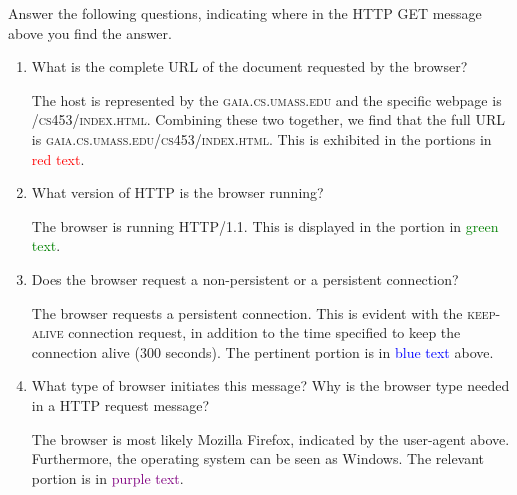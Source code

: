\begin{enumerate}
    Answer the following questions, indicating where in the HTTP GET message above you find the answer.

    \begin{enumerate}

      \item What is the complete URL of the document requested by the browser?

        The host is represented by the \textsc{gaia.cs.umass.edu} and the specific webpage is \textsc{/cs453/index.html}. Combining these two together, we find that the full URL is \textsc{gaia.cs.umass.edu/cs453/index.html}. This is exhibited in the portions in \textcolor{red}{red text}.

      \item What version of HTTP is the browser running?

        The browser is running HTTP/1.1. This is displayed in the portion in \textcolor{green}{green text}.

      \item Does the browser request a non-persistent or a persistent connection?

        The browser requests a persistent connection. This is evident with the \textsc{keep-alive} connection request, in addition to the time specified to keep the connection alive (300 seconds). The pertinent portion is in \textcolor{blue}{blue text} above.

      \item What type of browser initiates this message? Why is the browser type needed in a HTTP request message?

        The browser is most likely Mozilla Firefox, indicated by the user-agent above. Furthermore, the operating system can be seen as Windows. The relevant portion is in \textcolor{purple}{purple text}.

    \end{enumerate}
    
\end{enumerate}



